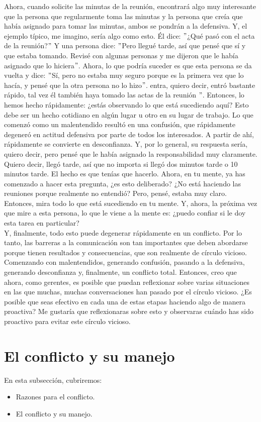 \documentclass[10pt]{book}
\begin{document}
Ahora, cuando solicite las minutas de la reunión, encontrará algo muy interesante que la persona que regularmente toma las minutas y la persona que creía que había asignado para tomar las minutas, ambos se pondrán a la defensiva. Y, el ejemplo típico, me imagino, sería algo como esto. Él dice: $"$¿Qué pasó con el acta de la reunión?$"$ Y una persona dice: $"$Pero llegué tarde, así que pensé que sí y que estaba tomando. Revisé con algunas personas y me dijeron que le había asignado que lo hiciera$"$. Ahora, lo que podría suceder es que esta persona se da vuelta y dice: $"$Sí, pero no estaba muy seguro porque es la primera vez que lo hacía, y pensé que la otra persona no lo hizo$"$. entra, quiero decir, entró bastante rápido, tal vez él también haya tomado las actas de la reunión $"$. Entonces, lo hemos hecho rápidamente: ¿estás observando lo que está sucediendo aquí? Esto debe ser un hecho cotidiano en algún lugar u otro en su lugar de trabajo. Lo que comenzó como un malentendido resultó en una confusión, que rápidamente degeneró en actitud defensiva por parte de todos los interesados. A partir de ahí, rápidamente se convierte en desconfianza. Y, por lo general, su respuesta sería, quiero decir, pero pensé que le había asignado la responsabilidad muy claramente. Quiero decir, llegó tarde, así que no importa si llegó dos minutos tarde o 10 minutos tarde. El hecho es que tenías que hacerlo. Ahora, en tu mente, ya has comenzado a hacer esta pregunta, ¿es esto deliberado? ¿No está haciendo las reuniones porque realmente no entendió? Pero, pensé, estaba muy claro. Entonces, mira todo lo que está sucediendo en tu mente. Y, ahora, la próxima vez que mire a esta persona, lo que le viene a la mente es: ¿puedo confiar si le doy esta tarea en particular?\\
Y, finalmente, todo esto puede degenerar rápidamente en un conflicto. Por lo tanto, las barreras a la comunicación son tan importantes que deben abordarse porque tienen resultados y consecuencias, que son realmente de círculo vicioso. Comenzando con malentendidos, generando confusión, pasando a la defensiva, generando desconfianza y, finalmente, un conflicto total. Entonces, creo que ahora, como gerentes, es posible que puedan reflexionar sobre varias situaciones en las que muchas, muchas conversaciones han pasado por el círculo vicioso. ¿Es posible que seas efectivo en cada una de estas etapas haciendo algo de manera proactiva? Me gustaría que reflexionaras sobre esto y observaras cuándo has sido proactivo para evitar este círculo vicioso. 
\section{El conflicto y su manejo}
En esta subsección, cubriremos:
\begin{itemize}
\item Razones para el conflicto.
\item El conflicto y su manejo.
\end{itemize}
\end{document}
